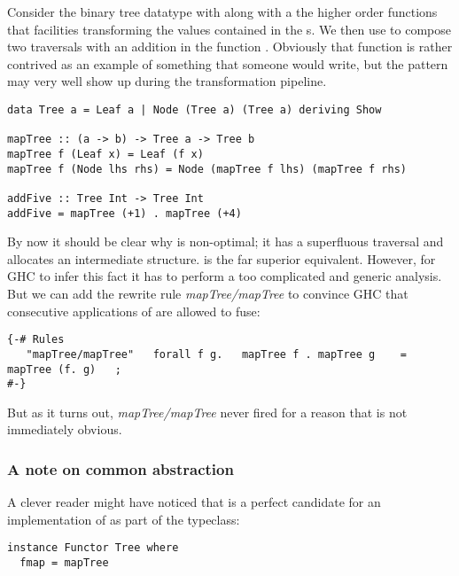 Consider the binary tree datatype  with along with a the higher order  functions that
facilities transforming the values contained in the s. We then use  to compose two
traversals with an addition in the function . Obviously that function is rather contrived as
an example of something that someone would write, but the pattern may very well show up during the transformation pipeline.


\begin{listing}[H]
\begin{verbatim}
data Tree a = Leaf a | Node (Tree a) (Tree a) deriving Show

mapTree :: (a -> b) -> Tree a -> Tree b
mapTree f (Leaf x) = Leaf (f x)
mapTree f (Node lhs rhs) = Node (mapTree f lhs) (mapTree f rhs)

addFive :: Tree Int -> Tree Int
addFive = mapTree (+1) . mapTree (+4)
\end{verbatim}
\end{listing}

By now it should be clear why  is non-optimal; it has a superfluous traversal and allocates an
intermediate structure.  is the far superior equivalent. However, for GHC to infer this fact
it has to perform a too complicated and generic analysis. But we can add the rewrite rule \textit{mapTree/mapTree}
to convince GHC that consecutive applications of  are allowed to fuse:

\begin{verbatim}
{-# Rules
   "mapTree/mapTree"   forall f g.   mapTree f . mapTree g    = mapTree (f. g)   ;
#-}
\end{verbatim}

But as it turns out, \textit{mapTree/mapTree} never fired for a reason that is not immediately obvious.

\subsubsection{A note on common abstraction}

A clever reader might have noticed that  is a perfect candidate for an implementation of 
as part of the  typeclass: 

\begin{verbatim}
instance Functor Tree where
  fmap = mapTree
\end{verbatim}


